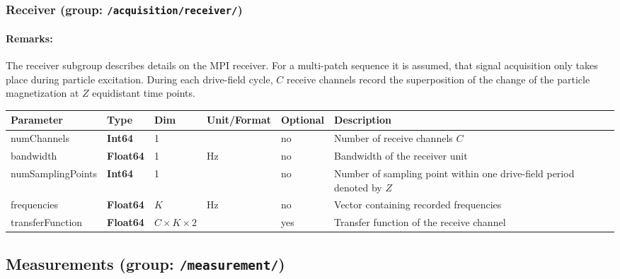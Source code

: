 \documentclass[landscape]{article} %
\newcommand{\inl}[1]{\lstinline[columns=fixed]{#1}}
\newcommand{\inltab}[1]{{\ttfamily\bfseries\color{blue}#1}}
\newcommand{\inlvar}[1]{{\ttfamily#1}}
\begin{document}
\subsubsection{Receiver (group: \inl{/acquisition/receiver/})}

\begin{multicols}{2}

\paragraph{Remarks:} The receiver subgroup describes details on the MPI receiver. For a multi-patch sequence it is assumed, that signal acquisition only takes place during particle excitation. During each drive-field cycle, $C$ receive channels record the superposition of the change of the particle magnetization at $Z$ equidistant time points.

\end{multicols}


\noindent \begin{tabularx}{\columnwidth}{lllllX} 
\textbf{Parameter} & \textbf{Type} & \textbf{Dim} & \textbf{Unit/Format} & \textbf{Optional} & \textbf{Description} \\ \hline 
\inlvar{numChannels} & \inltab{Int64} & 1 & & no & Number of receive channels $C$ \\ \hline 
\inlvar{bandwidth} & \inltab{Float64} & 1 & Hz & no & Bandwidth of the receiver unit \\ \hline
\inlvar{numSamplingPoints} & \inltab{Int64} & 1 &  & no & Number of sampling point within one drive-field period denoted by $Z$ \\ \hline
\inlvar{frequencies} & \inltab{Float64} & $K$ & Hz & no & Vector containing recorded frequencies \\ \hline
\inlvar{transferFunction} & \inltab{Float64} & $C \times K \times 2$ &  & yes & Transfer function of the receive channel \\ \hline
\end{tabularx}


\subsection{Measurements (group: \inl{/measurement/})}
\end{document}

